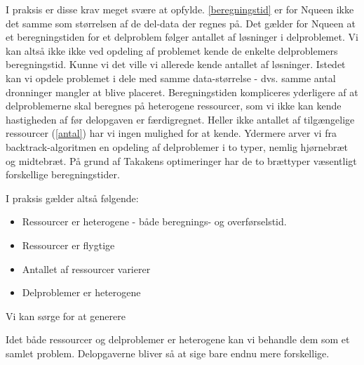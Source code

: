 \documentclass[draft,a4paper,10pt]{article}
\begin{document}
I praksis er disse krav meget svære at opfylde. \ref{beregningstid} er for Nqueen ikke det samme som størrelsen af de del-data der regnes på. Det gælder for Nqueen at et beregningstiden for et delproblem følger antallet af løsninger i delproblemet. Vi kan altså ikke ikke ved opdeling af problemet kende de enkelte delproblemers beregningstid. Kunne vi det ville vi allerede kende antallet af løsninger. Istedet kan vi opdele problemet i dele med samme data-størrelse - dvs. samme antal dronninger mangler at blive placeret.   Beregningstiden kompliceres yderligere af at delproblemerne skal beregnes på heterogene ressourcer, som vi ikke kan kende hastigheden af før delopgaven er færdigregnet. Heller ikke antallet af tilgængelige ressourcer (\ref{antal}) har vi ingen mulighed for at kende. Ydermere arver vi fra backtrack-algoritmen en opdeling af delproblemer i to typer, nemlig hjørnebræt og midtebræt. På grund af Takakens optimeringer  har de to brættyper væsentligt forskellige beregningstider. 

I praksis gælder altså følgende:
\begin{itemize}
	\item Ressourcer er heterogene - både beregnings- og overførselstid. 
	\item Ressourcer er flygtige
	\item Antallet af ressourcer varierer
	\item Delproblemer er heterogene
	\
\end{itemize}
 
Vi kan sørge for at generere 





Idet både ressourcer og delproblemer er heterogene kan vi behandle dem som et samlet problem. Delopgaverne bliver så at sige bare endnu mere forskellige.
\end{document}
